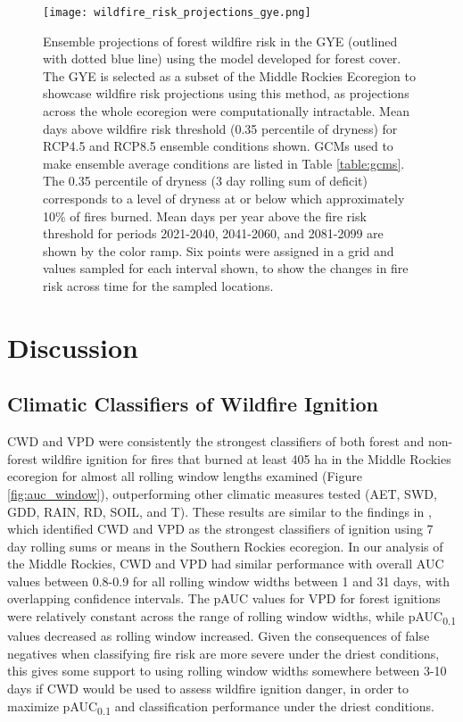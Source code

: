\documentclass[11p]{article}
\newcommand{\pauc}[1]{pAUC\textsubscript{#1}}
\begin{document}
\begin{table}
{\begin{figure}[htbp]
  \centering
  \texttt{[image: wildfire\_risk\_projections\_gye.png]}
  \caption{Ensemble projections of forest wildfire risk in the GYE (outlined with dotted blue line) using the model developed for forest cover. The GYE is selected as a subset of the Middle Rockies Ecoregion to showcase wildfire risk projections using this method, as projections across the whole ecoregion were computationally intractable. Mean days above wildfire risk threshold (0.35 percentile of dryness) for RCP4.5 and RCP8.5 ensemble conditions shown. GCMs used to make ensemble average conditions are listed in Table \ref{table:gcms}. The 0.35 percentile of dryness (3 day rolling sum of deficit) corresponds to a level of dryness at or below which approximately 10\% of fires burned. Mean days per year above the fire risk threshold for periods 2021-2040, 2041-2060, and 2081-2099 are shown by the color ramp. Six points were assigned in a grid and values sampled for each interval shown, to show the changes in fire risk across time for the sampled locations.}
  \label{fig:projected-risk}
\end{figure}


\section{Discussion}

\subsection{Climatic Classifiers of Wildfire Ignition}
CWD and VPD were consistently the strongest classifiers of both forest and non-forest wildfire ignition for fires that burned at least 405 ha in the Middle Rockies ecoregion for almost all rolling window lengths examined (Figure \ref{fig:auc_window}), outperforming other climatic measures tested (AET, SWD, GDD, RAIN, RD, SOIL, and T). These results are similar to the findings in , which identified CWD and VPD as the strongest classifiers of ignition using 7 day rolling sums or means in the Southern Rockies ecoregion. In our analysis of the Middle Rockies, CWD and VPD had similar performance with overall AUC values between 0.8-0.9 for all rolling window widths between 1 and 31 days, with overlapping confidence intervals. The pAUC values for VPD for forest ignitions were relatively constant across the range of rolling window widths, while \pauc{0.1} values decreased as rolling window increased. Given the consequences of false negatives when classifying fire risk are more severe under the driest conditions, this gives some support to using rolling window widths somewhere between 3-10 days if CWD would be used to assess wildfire ignition danger, in order to maximize \pauc{0.1} and classification performance under the driest conditions.

}
\end{table}
\end{document}
